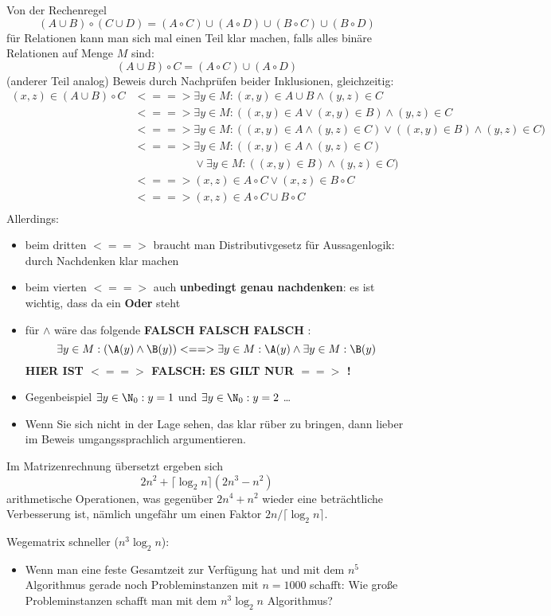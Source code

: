\begin{tutorium}
  Von der Rechenregel 
  \[
  (A\cup B)\circ(C\cup D) = (A\circ C) \cup (A\circ D) \cup (B\circ C) \cup (B \circ D)
  \]
  für Relationen kann man sich mal einen Teil klar machen, \zB falls
  alles binäre Relationen auf Menge $M$ sind:
  \[
  (A\cup B)\circ C = (A\circ C) \cup (A\circ D)
  \]
  (anderer Teil analog)
  Beweis durch Nachprüfen beider Inklusionen, \evtl gleichzeitig:
  \begin{align*}
    (x,z)\in (A\cup B)\circ C &<==> \exists y\in M: (x,y)\in A\cup B \land (y,z)\in C \\
    &<==> \exists y\in M: ((x,y)\in A \lor (x,y)\in B) \land (y,z)\in C \\
    &<==> \exists y\in M: ((x,y)\in A \land (y,z)\in C) \lor ((x,y)\in B) \land (y,z)\in C) \\
    &<==> \exists y\in M: ((x,y)\in A \land (y,z)\in C) \\
    &\phantom{<==> }\lor \exists y\in M: ((x,y)\in B) \land (y,z)\in C) \\
    &<==> (x,z)\in A\circ C \lor (x,z)\in B\circ C \\
    &<==> (x,z)\in A\circ C \cup B\circ C \\
  \end{align*}
  Allerdings: 
  \begin{itemize}
  \item beim dritten $<==>$ braucht man Distributivgesetz für
    Aussagenlogik: durch Nachdenken klar machen
  \item beim vierten $<==>$ auch \textbf{unbedingt genau
      nachdenken}: es ist wichtig, dass da ein \textbf{Oder} steht
  \item für $\land$ wäre das folgende \textbf{FALSCH FALSCH FALSCH
    }:
    \[
    \exists y\in M: (\A(y) \land \B(y) ) <==> \exists y\in M: \A(y)
    \land \exists y\in M:\B(y)
    \]
    \textbf{HIER IST $<==>$ FALSCH: ES GILT NUR $==>$ !}
  \item Gegenbeispiel $\exists y\in\N_0: y=1$ und $\exists y\in\N_0:
    y=2$ \dots
  \item Wenn Sie sich nicht in der Lage sehen, das klar rüber zu
    bringen, dann lieber im Beweis umgangssprachlich argumentieren.
  \end{itemize}
\end{tutorium}
%
Im Matrizenrechnung übersetzt ergeben sich 
\[
2n^2 + \lceil \log_2 n \rceil(2n^3-n^2)
\]
arithmetische Operationen, was gegenüber $2n^4+n^2$ wieder eine
beträchtliche Verbesserung ist, nämlich ungefähr um einen Faktor
$2n/\lceil \log_2 n \rceil$.
%
\begin{tutorium}
  Wegematrix schneller ($n^3\log_2 n$):
  \begin{itemize}
  \item Wenn man eine feste Gesamtzeit zur Verfügung hat und mit dem
    $n^5$ Algorithmus gerade noch Probleminstanzen mit $n=1000$
    schafft: Wie große Probleminstanzen schafft man mit dem
    $n^3\log_2 n$ Algorithmus?
  \end{itemize}
\end{tutorium}

